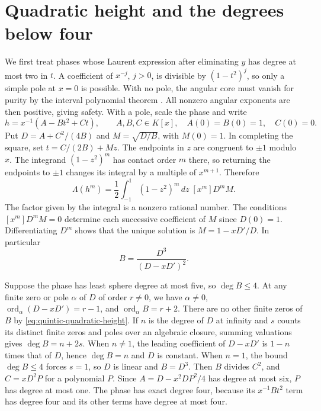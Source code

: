 \section{Quadratic height and the degrees below four}\label{sec:quadratic-height}

We first treat phases whose Laurent expression after eliminating \(y\)
has degree at most two in \(t\). A coefficient of \(x^{-j}\), \(j>0\),
is divisible by \((1-t^2)^j\), so only a simple pole at \(x=0\) is possible.
With no pole, the angular core must vanish for purity by the interval
polynomial theorem \cite[Theorem~2.1]{muger-tuset}. All nonzero angular exponents are then positive,
giving safety. With a pole, scale the phase and write
\[
 h=x^{-1}(A-Bt^2+Ct),\qquad A,B,C\in K[x],\quad A(0)=B(0)=1,\quad C(0)=0.
\]
Put \(D=A+C^2/(4B)\) and \(M=\sqrt{D/B}\), with \(M(0)=1\).
In completing the square, set \(t=C/(2B)+Mz\). The endpoints in \(z\)
are congruent to \(\pm1\) modulo \(x\). The integrand \((1-z^2)^m\)
has contact order \(m\) there, so returning the endpoints to \(\pm1\)
changes its integral by a multiple of \(x^{m+1}\). Therefore
\[
 \Lambda(h^m)=\frac12\int_{-1}^1(1-z^2)^m\,dz\;[x^m]D^mM.
\]
The factor given by the integral is a nonzero rational number.
The conditions \([x^m]D^mM=0\) determine each successive coefficient of
\(M\) since \(D(0)=1\). Differentiating \(D^m\) shows that the unique
solution is \(M=1-xD'/D\). In particular
\begin{equation}\label{eq:quintic-quadratic-height}
 B=\frac{D^3}{(D-xD')^2}.
\end{equation}

Suppose the phase has least sphere degree at most five, so \(\deg B\le4\).
At any finite zero or pole \(\alpha\) of \(D\) of order \(r\ne0\),
we have \(\alpha\ne0\), \(\operatorname{ord}_\alpha(D-xD')=r-1\), and
\(\operatorname{ord}_\alpha B=r+2\). There are no other finite zeros of
\(B\) by \eqref{eq:quintic-quadratic-height}. If \(n\) is the degree of
\(D\) at infinity and \(s\) counts its distinct finite zeros and poles
over an algebraic closure, summing valuations gives \(\deg B=n+2s\).
When \(n\ne1\), the leading coefficient of \(D-xD'\) is \(1-n\)
times that of \(D\), hence \(\deg B=n\) and \(D\) is constant.
When \(n=1\), the bound \(\deg B\le4\) forces \(s=1\), so \(D\) is
linear and \(B=D^3\). Then \(B\) divides \(C^2\), and \(C=xD^2P\)
for a polynomial \(P\). Since \(A=D-x^2DP^2/4\) has degree at most six,
\(P\) has degree at most one. The phase has exact degree four, because
its \(x^{-1}Bt^2\) term has degree four and its other terms have degree
at most four.

